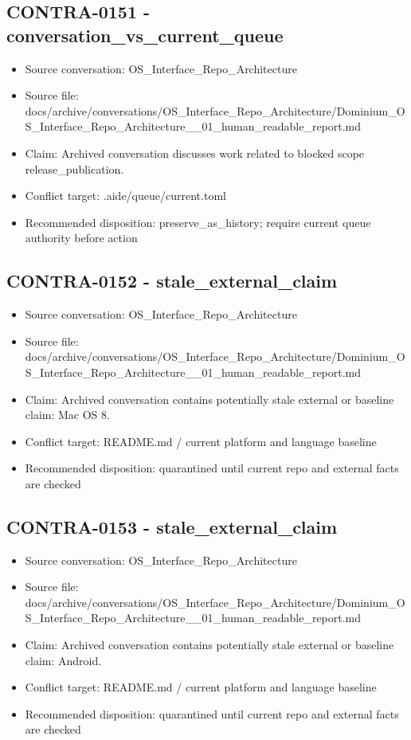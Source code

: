 \documentclass[11pt,a4paper]{report}
\begin{document}
\subsection{CONTRA-0151 - conversation\_vs\_current\_queue}

\begin{itemize}
\item Source conversation: OS\_Interface\_Repo\_Architecture
\item Source file: docs/archive/conversations/OS\_Interface\_Repo\_Architecture/Dominium\_OS\_Interface\_Repo\_Architecture\_\_01\_human\_readable\_report.md
\item Claim: Archived conversation discusses work related to blocked scope release\_publication.
\item Conflict target: .aide/queue/current.toml
\item Recommended disposition: preserve\_as\_history; require current queue authority before action
\end{itemize}

\subsection{CONTRA-0152 - stale\_external\_claim}

\begin{itemize}
\item Source conversation: OS\_Interface\_Repo\_Architecture
\item Source file: docs/archive/conversations/OS\_Interface\_Repo\_Architecture/Dominium\_OS\_Interface\_Repo\_Architecture\_\_01\_human\_readable\_report.md
\item Claim: Archived conversation contains potentially stale external or baseline claim: Mac OS 8.
\item Conflict target: README.md / current platform and language baseline
\item Recommended disposition: quarantined until current repo and external facts are checked
\end{itemize}

\subsection{CONTRA-0153 - stale\_external\_claim}

\begin{itemize}
\item Source conversation: OS\_Interface\_Repo\_Architecture
\item Source file: docs/archive/conversations/OS\_Interface\_Repo\_Architecture/Dominium\_OS\_Interface\_Repo\_Architecture\_\_01\_human\_readable\_report.md
\item Claim: Archived conversation contains potentially stale external or baseline claim: Android.
\item Conflict target: README.md / current platform and language baseline
\item Recommended disposition: quarantined until current repo and external facts are checked
\end{itemize}
\end{document}

